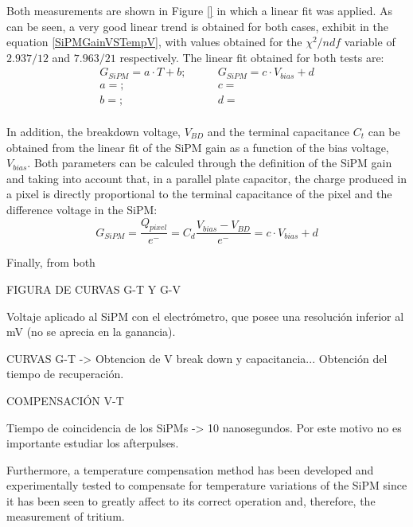 Both measurements are shown in Figure \ref{} in which a linear fit was applied. As can be seen, a very good linear trend is obtained for both cases, exhibit in the equation \ref{SiPMGainVSTempV}, with values obtained for the $\chi^2/ndf$ variable of $2.937/12$ and $7.963/21$ respectively. The linear fit obtained for both tests are:
\begin{equation*}
\begin{split}
G_{SiPM}=a \cdot{} T + b;& \qquad G_{SiPM}=c \cdot{} V_{bias} + d\\
a=;& \qquad c=\\
b=;& \qquad d=\\
\label{SiPMGainVSTempV}
\end{split}
\end{equation*} 


In addition, the breakdown voltage, $V_{BD}$ and the terminal capacitance $C_t$ can be obtained from the linear fit of the SiPM gain as a function of the bias voltage, $V_{bias}$. Both parameters can be calculed through the definition of the SiPM gain and taking into account that, in a parallel plate capacitor, the charge produced in a pixel is directly proportional to the terminal capacitance of the pixel and the difference voltage in the SiPM:
\begin{equation}
G_{SiPM}=\frac{Q_{pixel}}{e^-} = C_d \frac{V_{bias}-V_{BD}}{e^-} = c \cdot{} V_{bias}+d
\label{SiPMGain_Capacitance}
\end{equation}


Finally, from both 

FIGURA DE CURVAS G-T Y G-V



Voltaje aplicado al SiPM con el electrómetro, que posee una resolución inferior al mV (no se aprecia en la ganancia).



CURVAS G-T -> Obtencion de V break down y capacitancia... Obtención del tiempo de recuperación.

COMPENSACIÓN V-T






Tiempo de coincidencia de los SiPMs -> 10 nanosegundos. Por este motivo no es importante estudiar los afterpulses.


Furthermore, a temperature compensation method has been developed and experimentally tested to compensate for temperature variations of the SiPM since it has been seen to greatly affect to its correct operation and, therefore, the measurement of tritium.


